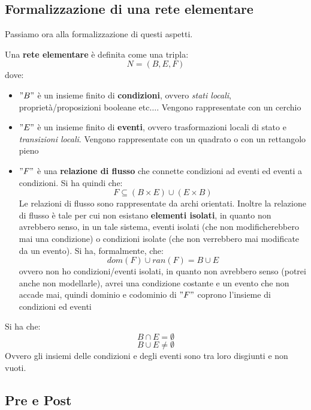 \subsection{Formalizzazione di una rete elementare}
Passiamo ora alla formalizzazione di questi aspetti.\\
\begin{definizione}
  Una \textbf{rete elementare} è definita come una tripla:
  \[N=(B, E, F)\]
  dove:
  \begin{itemize}
    \item $"B"$ è un insieme finito di \textbf{condizioni}, ovvero \textit{stati
      locali}, proprietà/proposizioni booleane etc$\ldots$. Vengono
    rappresentate con un cerchio 
    \item $"E"$ è un insieme finito di \textbf{eventi}, ovvero trasformazioni
    locali di stato e \textit{transizioni locali}. Vengono rappresentate con un
    quadrato o con un rettangolo pieno
    \item $"F"$ è una \textbf{relazione di flusso} che connette condizioni ad
    eventi ed eventi a condizioni. Si ha quindi che:
    \[F\subseteq (B\times E)\cup(E\times B)\]
    Le relazioni di flusso sono rappresentate da archi orientati. Inoltre la
    relazione di flusso è tale per cui non esistano \textbf{elementi isolati},
    in quanto non avrebbero senso, in un tale sistema, eventi isolati (che non
    modificherebbero mai una condizione) o condizioni isolate (che non
    verrebbero mai modificate da un evento). Si ha, formalmente, che: 
    \[dom(F)\cup ran(F)=B\cup E\]
    ovvero non ho condizioni/eventi isolati, in quanto non avrebbero senso
    (potrei anche non modellarle), avrei una condizione costante e un
    evento che non accade mai, quindi dominio e codominio di $"F"$ coprono
    l'insieme di condizioni ed eventi
  \end{itemize}
  Si ha che:
  \[B\cap E = \emptyset\]
  \[B\cup E \neq \emptyset\]
  Ovvero gli insiemi delle condizioni e degli eventi sono tra loro disgiunti e
  non vuoti.\\
  \subsection{Pre e Post}
  \begin{definizione}
    

\end{definizione}
\end{definizione}

